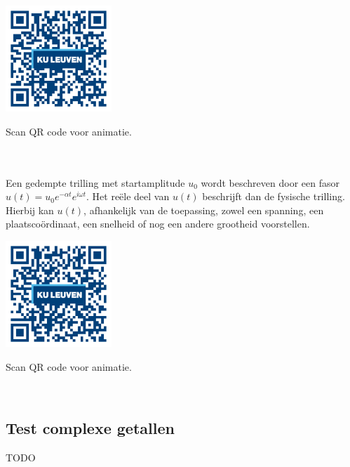 \begin{minipage}{.25\linewidth}
	\raggedright
	\includegraphics[width=4cm]{3_gonio_complexe_getallen/inputs/QR_Code_ANIMATIE6_module3new}
\end{minipage}
\begin{minipage}{.7\linewidth}
	Scan QR code voor animatie.
\end{minipage}    \\     \\

Een gedempte trilling met startamplitude $u_{0}$ wordt beschreven door een fasor $u(t)=u_{0}e^{-\alpha t}e^{i\omega t}$. Het re\"{e}le deel van $u(t)$ beschrijft dan de fysische trilling. Hierbij kan $u(t)$, afhankelijk van de toepassing, zowel een spanning, een plaatsco\"{o}rdinaat, een snelheid of nog een andere grootheid voorstellen.\\

\begin{minipage}{.25\linewidth}
	\raggedright
	\includegraphics[width=4cm]{3_gonio_complexe_getallen/inputs/QR_Code_ANIMATIE7_module3new}
\end{minipage}
\begin{minipage}{.7\linewidth}
	Scan QR code voor animatie.
\end{minipage}   \\

\subsection{Test complexe getallen}
TODO